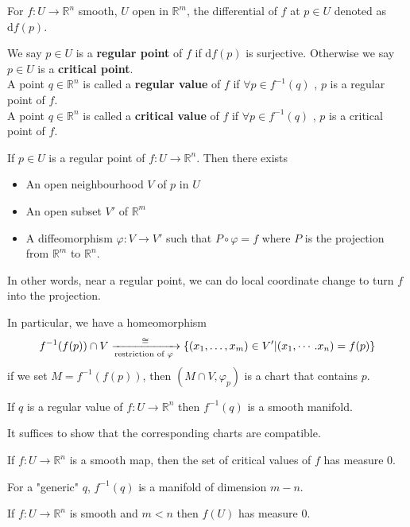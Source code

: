 For  $ f:U\rightarrow \mathbb{R}^n $ smooth,  $ U  $ open in  $ \mathbb{R}^m $,  the differential of  $ f  $ at  $ p\in U  $ denoted as  $ \mathrm{d}f(p) $.  
\begin{definition}
    We say  $ p\in U  $ is a \textbf{regular point} of  $ f  $ if  $ \mathrm{d}f(p)  $ is surjective. Otherwise we say  $ p\in U  $ is a \textbf{critical point}.\\
    A point  $ q\in \mathbb{R}^n  $ is called a \textbf{regular value} of  $ f  $ if  $ \forall  p\in f^{-1}(q)  $ ,  $ p  $ is a regular point of  $ f $.\\
    A point  $ q\in \mathbb{R}^n  $ is called a \textbf{critical value} of  $ f  $ if  $ \forall  p\in f^{-1}(q)  $ ,  $ p  $ is a critical point of  $ f $.
\end{definition}
\begin{theorem}
    If  $ p\in U  $ is a regular point of  $ f:U\rightarrow \mathbb{R}^n  $. Then there exists 
    \begin{itemize}
        \item An open neighbourhood  $ V  $ of  $ p  $ in  $ U  $
        \item An open subset  $ V'  $ of  $ \mathbb{R}^m $
        \item  A diffeomorphism  $ \varphi:V\rightarrow V'  $ such that  $ P\circ \varphi=f $ where  $ P  $ is the projection from  $ \mathbb{R}^m $ to  $ \mathbb{R}^n $. 
    \end{itemize}
    In other words, near a regular point, we can do local coordinate change to turn  $ f  $ into the projection.
\end{theorem}
\begin{remark}
    In particular, we have a homeomorphism
    \[ f^{-1}(f(p))\cap V \xrightarrow[\text{restriction of  $ \varphi $ }]{\cong }\{(x_1,\dots,x_m)\in V'|(x_1,\cdots.x_n)=f(p)\}\]
    \ie if we set  $ M=f^{-1}(f(p)) $, then  $ (M\cap V,\varphi_p) $ is a chart that contains  $ p  $.  
\end{remark}
\begin{corollary}
    If  $ q  $ is a regular value of  $ f:U\rightarrow \mathbb{R}^n $ then  $ f^{-1}(q) $ is a smooth manifold.
\end{corollary}
\begin{remark}
    It suffices to show that the corresponding charts are compatible.
\end{remark}
\begin{theorem}[Sard]
    If  $ f:U\rightarrow \mathbb{R}^n $ is a smooth map, then the set of critical values of  $ f $ has measure $  0 $.
\end{theorem}
\begin{remark}
    For a "generic"  $ q  $,  $ f^{-1}(q)  $ is a manifold of dimension  $ m-n $. 
\end{remark}
\begin{corollary}
    If  $ f:U\rightarrow\mathbb{R}^n $ is smooth and  $ m<n  $ then  $ f(U ) $ has measure $  0  $. 
\end{corollary}
